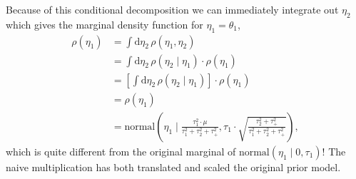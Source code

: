 \documentclass[11pt, oneside]{article}
\begin{document}
Because of this conditional decomposition we can immediately integrate out $\eta_{2}$ which gives the marginal density function for $\eta_{1} = \theta_{1}$,
%
\begin{align*}
\rho(\eta_{1}) 
&=
\int \mathrm{d} \eta_{2} \, \rho(\eta_{1}, \eta_{2})
\\
&=
\int \mathrm{d} \eta_{2} \, \rho(\eta_{2} \mid \eta_{1}) \cdot \rho(\eta_{1})
\\
&=
\left[ \int \mathrm{d} \eta_{2} \, \rho(\eta_{2} \mid \eta_{1}) \right] \cdot \rho(\eta_{1})
\\
&=
\rho(\eta_{1})
\\
&=
\text{normal} \left( \eta_{1} \mid \frac{ \tau_{1}^{2} \cdot \mu }{ \tau_{1}^{2} + \tau_{2}^{2} + \tau_{+}^{2} }, 
\tau_{1} \cdot \sqrt{ \frac{ \tau_{2}^{2} + \tau_{+}^{2} }{ \tau_{1}^{2} + \tau_{2}^{2} + \tau_{+}^{2} } } \right),
\end{align*}
%
which is quite different from the original marginal of $\text{normal}(\eta_{1} \mid 0, \tau_{1})$!  The naive multiplication has both translated and scaled the original prior model.
\end{document}
